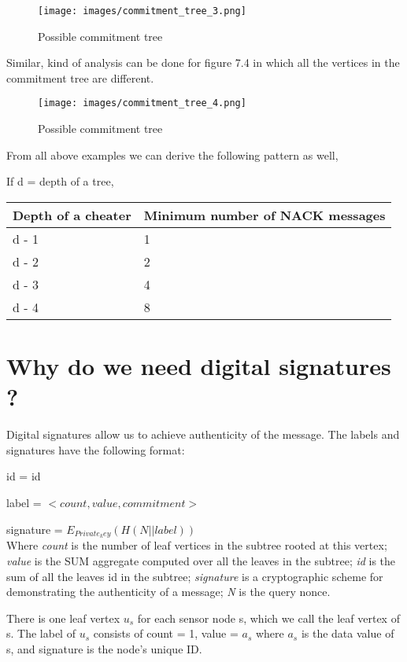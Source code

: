 	\begin{figure}[t]
		\centering
			\texttt{[image: images/commitment\_tree\_3.png]}
			\caption{Possible commitment tree}
	\end{figure}

	Similar, kind of analysis can be done for figure 7.4 in which all the vertices in the commitment tree are different. 

	\begin{figure}[t]
		\centering
			\texttt{[image: images/commitment\_tree\_4.png]}
			\caption{Possible commitment tree}
	\end{figure}

	From all above examples we can derive the following pattern as well,

	If d = depth of a tree,\\

	\begin{tabular}{| l | l |}
    \hline
    Depth of a cheater & Minimum number of NACK messages \\ \hline
    d - 1 & 1 \\ \hline
    d - 2 & 2 \\ \hline
    d - 3 & 4 \\ \hline
    d - 4 & 8 \\ \hline
  \end{tabular}


	\section{ Why do we need digital signatures ?}
	Digital signatures allow us to achieve authenticity of the message. 
	The labels and signatures have the following format:

	id = id

	label = $<count, value, commitment>$

	signature = $E_{Private_key}( H( N || label ) )$\\
	Where \textit{count} is the number of leaf vertices in the subtree rooted at this vertex; 
	\textit{value} is the SUM aggregate computed over all the leaves in the subtree; \textit{id} is the sum of all the leaves id in the subtree; \textit{signature} is a cryptographic scheme for demonstrating the authenticity of a message; \textit{N} is the query nonce. 
	
	There is one leaf vertex $u_{s}$ for each sensor node s, which we call the leaf vertex of s. The label of $u_{s}$ consists of count = 1, value = $a_{s}$ where $a_{s}$ is the data value of s, and signature is the node's unique ID.

